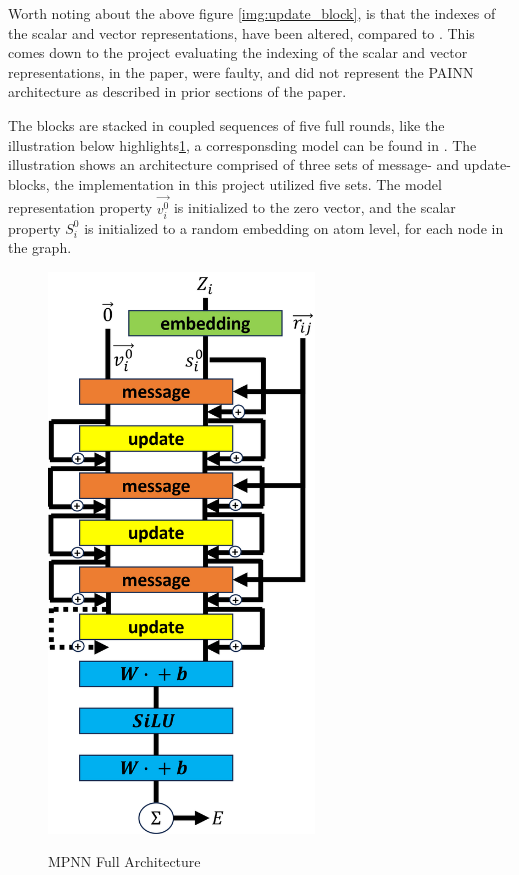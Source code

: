 Worth noting about the above figure \ref{img:update_block}, is that the indexes of the scalar and vector representations, 
have been altered, compared to \cite{PAINN}. This comes down to the project evaluating the indexing of the scalar and vector
representations, in the paper, were faulty, and did not represent the PAINN architecture as described in prior sections of the
paper.

The blocks are stacked in coupled sequences of five full rounds, like the illustration below highlights\ref{img:MPNN_arc}, a corresponsding model can be found
in \cite{PAINN}. The illustration shows an architecture comprised of three sets of message- and update-blocks, the implementation in this project utilized
five sets. The model representation property $\vec{v_i^{0}}$ is initialized to the zero vector, and the scalar property $S_{i}^{0}$
is initialized to a random embedding on atom level, for each node in the graph.


\begin{figure}[H]
    \caption{MPNN Full Architecture}
    \centering\label{img:MPNN_arc}
    \includegraphics[width=200pt]{Images/Method/MPNN_arc.png}
\end{figure}


